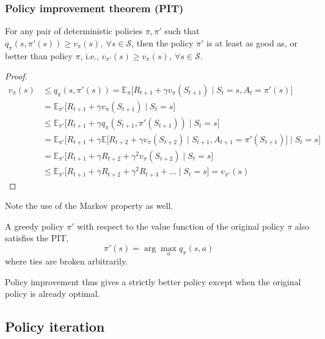 \subsubsection{Policy improvement theorem (PIT)}

For any pair of deterministic policies \( \pi, \pi' \) such that \( q_\pi(s, \pi'(s)) \geq v_\pi(s), \ \forall s \in \mathcal{S} \), then the policy \( \pi' \) is at least as good as, or better than policy \( \pi \), i.e., \( v_{\pi'}(s) \geq v_\pi(s), \ \forall s \in \mathcal{S} \).
\begin{proof}
    \begin{equation*}
        \begin{aligned}
            v_{\pi}(s)
             & \leq
            q_{\pi}(s, \pi'(s))
            =
            \mathbb{E}_{\pi} \big[ R_{t+1} + \gamma v_{\pi}(S_{t+1}) \;\big|\; S_t = s, A_t = \pi'(s) \big]
            \\ & =
            \mathbb{E}_{\pi'} \big[ R_{t+1} + \gamma v_{\pi}(S_{t+1}) \;\big|\; S_t = s \big]
            \\ & \leq
            \mathbb{E}_{\pi'} \big[ R_{t+1} + \gamma q_{\pi}(S_{t+1}, \pi'(S_{t+1})) \;\big|\; S_t = s \big]
            \\ & =
            \mathbb{E}_{\pi'} \big[ R_{t+1} + \gamma \mathbb{E} \big[ R_{t+2} + \gamma v_{\pi}(S_{t+2}) \;\big|\; S_{t+1}, A_{t+1} = \pi'(S_{t+1}) \big] \;\big|\; S_t = s \big]
            \\ & =
            \mathbb{E}_{\pi'} \big[ R_{t+1} + \gamma R_{t+2} + \gamma^2 v_{\pi}(S_{t+2}) \;\big|\; S_t = s \big]
            \\ & \leq
            \mathbb{E}_{\pi'} \big[ R_{t+1} + \gamma R_{t+2} + \gamma^2 R_{t+3} + \dots \;\big|\; S_t = s \big]
            = v_{\pi'}(s)
        \end{aligned}
    \end{equation*}
\end{proof}
Note the use of the Markov property as well.

A greedy policy \( \pi' \) with respect to the value function of the original policy \( \pi \) also satisfies the PIT,
\begin{equation}
    \pi'(s) = \arg\max_{a} q_\pi(s, a)
\end{equation}
where ties are broken arbitrarily.

Policy improvement thus gives a strictly better policy except when the original policy is already optimal.

\subsection{Policy iteration}

